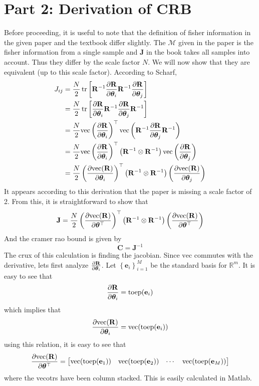 \documentclass[a4paper]{article}
\begin{document}
  \section*{Part 2: Derivation of CRB}%
  Before proceeding, it is useful to note that the definition of fisher information in the given paper and the textbook differ slightly. The $\mathcal{M}$ given in the paper is the fisher information from a single sample and $\mathbf{J}$ in the book takes all samples into account. Thus they differ by the scale factor $N$. We will now show that they are equivalent (up to this scale factor). According to Scharf,
  \[
    \begin{aligned}
      J_{ij} &= \frac{N}{2} \tr \left[ \mathbf{R}^{-1} \pdv{\mathbf{R}}{\bm{\theta}_i}  \mathbf{R}^{-1} \pdv{\mathbf{R}}{\bm{\theta}_j}\right] \\
             &= \frac{N}{2} \tr \left[\pdv{\mathbf{R}}{\bm{\theta}_i}  \mathbf{R}^{-1} \pdv{\mathbf{R}}{\bm{\theta}_j} \mathbf{R}^{-1}\right] \\
             &= \frac{N}{2} \text{vec} \left( \pdv{\mathbf{R}}{\bm{\theta}_i} \right)^\top \text{vec} \left( \mathbf{R}^{-1} \pdv{\mathbf{R}}{\bm{\theta}_j} \mathbf{R}^{-1} \right) \\
             &= \frac{N}{2} \text{vec} \left( \pdv{\mathbf{R}}{\bm{\theta}_i} \right)^\top \left( \mathbf{R}^{-1} \otimes \mathbf{R}^{-1} \right) \text{vec} \left( \pdv{\mathbf{R}}{\bm{\theta}_j}\right) \\
             &=\frac{N}{2} \left( \pdv{\text{vec}(\mathbf{R})}{\bm{\theta}_i} \right)^\top \left( \mathbf{R}^{-1} \otimes \mathbf{R}^{-1} \right) \left( \pdv{\text{vec}(\mathbf{R})}{\bm{\theta}_j}\right) \\
    \end{aligned}
  \]
  It appears according to this derivation that the paper is missing a scale factor of 2. From this, it is straightforward to show that
  \[
    \mathbf{J} = \frac{N}{2}  \left( \pdv{\text{vec}(\mathbf{R})}{\bm{\theta}^\top} \right)^\top \left(\mathbf{R}^{-1} \otimes \mathbf{R}^{-1} \right) \left( \pdv{\text{vec}(\mathbf{R})}{\bm{\theta}^\top} \right)
  \]
  And the cramer rao bound is given by
  \[
    \mathbf{C} = \mathbf{J}^{-1}
  \]
  The crux of this calculation is finding the jacobian. Since $\text{vec}$ commutes with the derivative, lets first analyze $\pdv{\mathbf{R}}{\bm{\theta}_i}$. Let $\left\{\mathbf{e}_i\right\}_{i=1}^M$ be the standard basis for $\mathds{R}^m$. It is easy to see that
  \[
    \pdv{\mathbf{R}}{\bm{\theta}_i} = \text{toep}(\mathbf{e}_i)
  \]
  which implies that
  \[
    \pdv{\text{vec}(\mathbf{R})}{\bm{\theta}_i} = \text{vec}(\text{toep}(\mathbf{e}_i))
  \]
  using this relation, it is easy to see that
  \[
    \pdv{\text{vec}(\mathbf{R})}{\bm{\theta}^\top} = 
    \begin{bmatrix}
      \text{vec}(\text{toep}(\mathbf{e}_1)) &  \text{vec}(\text{toep}(\mathbf{e}_2)) & \cdots & \text{vec}(\text{toep}(\mathbf{e}_M)) 
    \end{bmatrix}
  \]
  where the vecotrs have been column stacked. This is easily calculated in Matlab.
\end{document}
